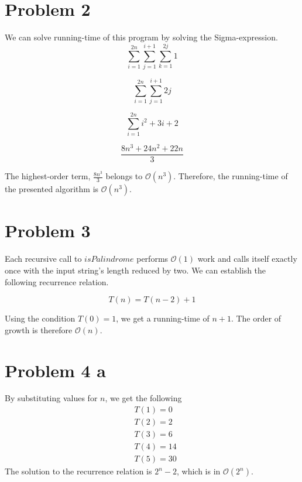\documentclass{article}
\newenvironment{problem}[1]{
  \nobreak\section*{Problem #1}
}{}
\newcommand*{\bigO}[1]{\ensuremath{\mathcal{O}\left(#1\right)}}
\begin{document}
  \begin{problem}{2}
    We can solve running-time of this program by solving the Sigma-expression.
    \begin{displaymath}
      \sum_{i = 1}^{2n} \sum_{j = 1}^{i + 1} \sum_{k = 1}^{2j} 1
    \end{displaymath}

    \begin{displaymath}
      \sum_{i = 1}^{2n} \sum_{j = 1}^{i + 1} 2j
    \end{displaymath}

    \begin{displaymath}
      \sum_{i = 1}^{2n} i^2 + 3i + 2
    \end{displaymath}

    \begin{displaymath}
      \frac{8n^3 + 24n^2 + 22n}{3}
    \end{displaymath}

    The highest-order term, $\frac{8n^3}{3}$ belongs to \bigO{n^3}.
    Therefore, the running-time of the presented algorithm is \bigO{n^3}.
  \end{problem}

  \begin{problem}{3}
    Each recursive call to $isPalindrome$ performs \bigO{1} work and
    calls itself exactly once with the input string's length reduced by
    two.  We can establish the following recurrence relation.

    \begin{displaymath}
      T(n) = T(n - 2) + 1
    \end{displaymath}

    Using the condition $T(0) = 1$, we get a running-time of $n + 1$.  The
    order of growth is therefore \bigO{n}.
  \end{problem}

  \begin{problem}{4 a}
    By substituting values for $n$, we get the following
    \begin{equation*}
      \begin{split}
        &T(1) = 0\\
        &T(2) = 2\\
        &T(3) = 6\\
        &T(4) = 14\\
        &T(5) = 30
      \end{split}
    \end{equation*}
    The solution to the recurrence relation is $2^n-2$, which is in \bigO{2^n}.
  \end{problem}
\end{document}

